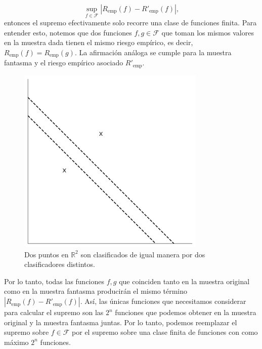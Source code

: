 \documentclass{report}
\begin{document}
\[
\sup_{f \in \mathcal{F}} |R_{\text{emp}}(f) - R'_{\text{emp}}(f)|,
\]
entonces el supremo efectivamente solo recorre una clase de funciones finita. Para entender esto, notemos que 
dos funciones \(f, g \in \mathcal{F}\) que toman los mismos valores en la muestra dada tienen el mismo riesgo empírico, 
es decir, \(R_{\text{emp}}(f) = R_{\text{emp}}(g)\). La afirmación análoga se cumple para la muestra fantasma 
y el riesgo empírico asociado \(R'_{\text{emp}}\). \newline

\begin{figure}[ht]
    \centering
    \includegraphics[width=0.8\textwidth]{Images/8.png}
    
    \caption{Dos puntos en $\mathbb{R}^2$ son clasificados de igual manera por dos clasificadores distintos.}
    \label{clasificacion identica con distintos clasificadores}
\end{figure}

Por lo tanto, todas las funciones \(f, g\) que coinciden tanto en la muestra original como en la muestra fantasma 
producirán el mismo término \(|R_{\text{emp}}(f) - R'_{\text{emp}}(f)|\). Así, las únicas funciones que 
necesitamos considerar para calcular el supremo son las \(2^{n}\) funciones que podemos obtener en la muestra 
original y la muestra fantasma juntas. Por lo tanto, podemos reemplazar el supremo sobre \(f \in \mathcal{F}\) por el 
supremo sobre una clase finita de funciones con como máximo \(2^{n}\) funciones.\newline
\end{document}
